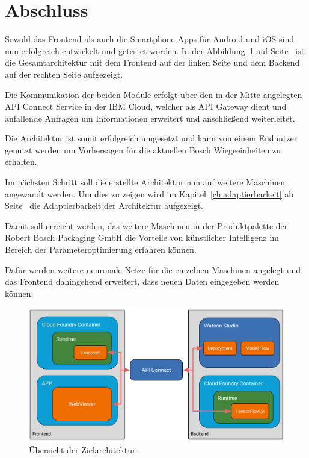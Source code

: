 \section{Abschluss}
Sowohl das Frontend als auch die Smartphone-Apps für Android und iOS sind nun erfolgreich entwickelt und getestet worden.
In der Abbildung~\ref{fig:umsetzung_zielarchitektur_4} auf Seite~\pageref{fig:umsetzung_zielarchitektur_4} ist die
Gesamtarchitektur mit dem Frontend auf der linken Seite und dem Backend auf der rechten Seite aufgezeigt.

Die Kommunikation der beiden Module erfolgt über den in der Mitte angelegten API Connect Service in der IBM Cloud,
welcher als API Gateway dient und anfallende Anfragen um Informationen erweitert und anschließend weiterleitet.

Die Architektur ist somit erfolgreich umgesetzt und kann von einem Endnutzer genutzt werden um Vorhersagen für die
aktuellen Bosch Wiegeeinheiten zu erhalten.

Im nächsten Schritt soll die erstellte Architektur nun auf weitere Maschinen angewandt werden. Um dies zu zeigen wird
im Kapitel~\ref{ch:adaptierbarkeit} ab Seite~\pageref{ch:adaptierbarkeit} die Adaptierbarkeit der Architektur aufgezeigt.

Damit soll erreicht werden, das weitere Maschinen in der Produktpalette der Robert Bosch Packaging GmbH die Vorteile von
künstlicher Intelligenz im Bereich der Parameteroptimierung erfahren können.

Dafür werden weitere neuronale Netze für die einzelnen Maschinen angelegt und das Frontend dahingehend erweitert,
dass neuen Daten eingegeben werden können.

\begin{figure}[h]
    \centering
    \includegraphics[width=\textwidth]{images/kapitel_4/architektur_uebersicht.pdf}
    \caption{Übersicht der Zielarchitektur}
    \label{fig:umsetzung_zielarchitektur_4}
\end{figure}
